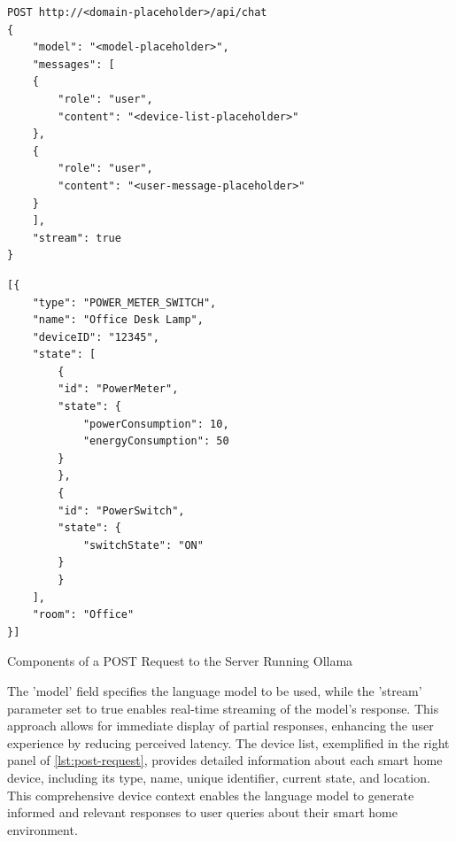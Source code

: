 \captionsetup[lstlisting]{labelformat=empty}
\begin{Listing}[h]
\begin{minipage}{0.53\textwidth}
    \begin{lstlisting}[caption={Base Structure of each POST Request}, label=lst:first, frame=single]
POST http://<domain-placeholder>/api/chat
{
    "model": "<model-placeholder>",
    "messages": [
    {
        "role": "user",
        "content": "<device-list-placeholder>"
    },
    {
        "role": "user",
        "content": "<user-message-placeholder>"
    }
    ],
    "stream": true
}
    \end{lstlisting}
    \end{minipage}
    \hfill
    \begin{minipage}{0.4\textwidth}
    \vspace{10pt}
    \begin{lstlisting}[caption={Example Device List containing only a Smart Plug}, label=lst:second, frame=single]
[{
    "type": "POWER_METER_SWITCH",
    "name": "Office Desk Lamp",
    "deviceID": "12345",
    "state": [
        {
        "id": "PowerMeter",
        "state": {
            "powerConsumption": 10,
            "energyConsumption": 50
        }
        },
        {
        "id": "PowerSwitch",
        "state": {
            "switchState": "ON"
        }
        }
    ],
    "room": "Office"
}]
    \end{lstlisting}
    \end{minipage}
    \caption{Components of a POST Request to the Server Running Ollama}
    \label{lst:post-request}
\end{Listing}
\captionsetup{labelformat=default}

The 'model' field specifies the language model to be used, while the 'stream' parameter set to true enables real-time streaming of the model's response. This approach allows for immediate display of partial responses, enhancing the user experience by reducing perceived latency.
The device list, exemplified in the right panel of \cref{lst:post-request}, provides detailed information about each smart home device, including its type, name, unique identifier, current state, and location. This comprehensive device context enables the language model to generate informed and relevant responses to user queries about their smart home environment.


